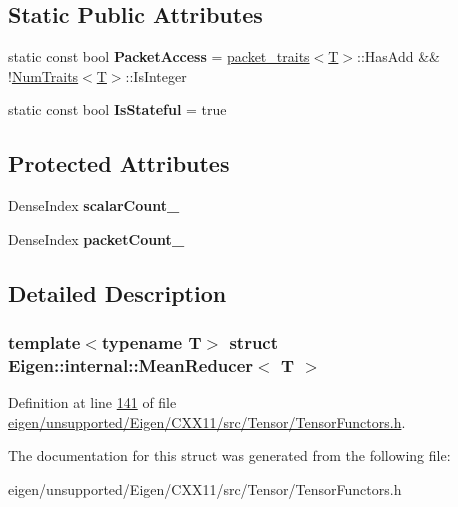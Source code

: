 \subsection*{Static Public Attributes}
\begin{DoxyCompactItemize}
\item 
\mbox{\label{struct_eigen_1_1internal_1_1_mean_reducer_aee44053eb0a2b476a8465943a5202a49}} 
static const bool {\bfseries Packet\+Access} = \hyperlink{struct_eigen_1_1internal_1_1packet__traits}{packet\+\_\+traits}$<$\hyperlink{group___sparse_core___module}{T}$>$\+::Has\+Add \&\& !\hyperlink{group___core___module_struct_eigen_1_1_num_traits}{Num\+Traits}$<$\hyperlink{group___sparse_core___module}{T}$>$\+::Is\+Integer
\item 
\mbox{\label{struct_eigen_1_1internal_1_1_mean_reducer_a21e27bc89fc8189ff3a869a17e24ef90}} 
static const bool {\bfseries Is\+Stateful} = true
\end{DoxyCompactItemize}
\subsection*{Protected Attributes}
\begin{DoxyCompactItemize}
\item 
\mbox{\label{struct_eigen_1_1internal_1_1_mean_reducer_a74b875a984110becaf1cb1b3800060d8}} 
Dense\+Index {\bfseries scalar\+Count\+\_\+}
\item 
\mbox{\label{struct_eigen_1_1internal_1_1_mean_reducer_ae9c73087ba000a3c4128b074bb6c2b5c}} 
Dense\+Index {\bfseries packet\+Count\+\_\+}
\end{DoxyCompactItemize}


\subsection{Detailed Description}
\subsubsection*{template$<$typename T$>$\newline
struct Eigen\+::internal\+::\+Mean\+Reducer$<$ T $>$}



Definition at line \hyperlink{eigen_2unsupported_2_eigen_2_c_x_x11_2src_2_tensor_2_tensor_functors_8h_source_l00141}{141} of file \hyperlink{eigen_2unsupported_2_eigen_2_c_x_x11_2src_2_tensor_2_tensor_functors_8h_source}{eigen/unsupported/\+Eigen/\+C\+X\+X11/src/\+Tensor/\+Tensor\+Functors.\+h}.



The documentation for this struct was generated from the following file\+:\begin{DoxyCompactItemize}
\item 
eigen/unsupported/\+Eigen/\+C\+X\+X11/src/\+Tensor/\+Tensor\+Functors.\+h\end{DoxyCompactItemize}
